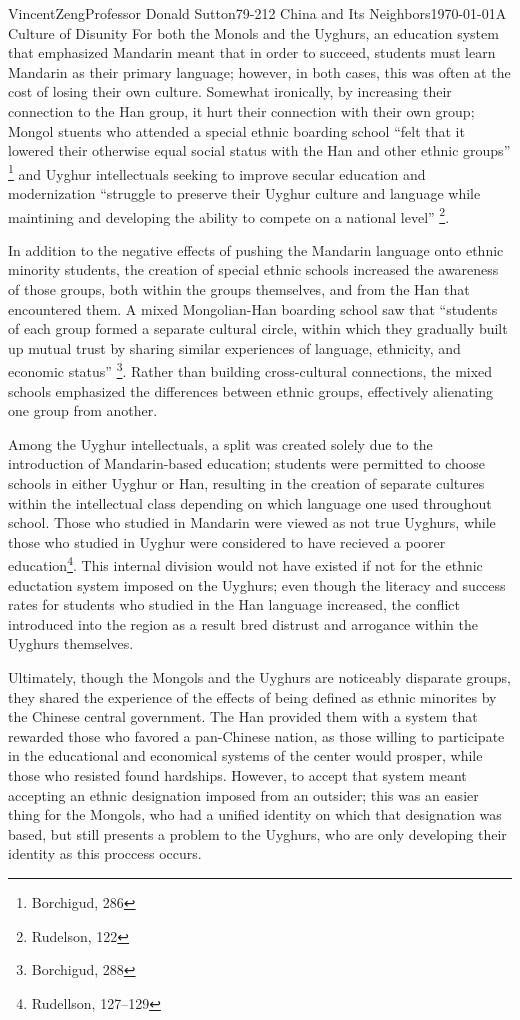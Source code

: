 \documentclass{article}[12pt]
\begin{document}
\begin{mla}{Vincent}{Zeng}{Professor Donald Sutton}{79-212 China and Its Neighbors}{\today}{A Culture of Disunity}
For both the Monols and the Uyghurs, an education system that emphasized
Mandarin meant that in order to succeed, students must learn Mandarin as their
primary language; however, in both cases, this was often at the cost of losing
their own culture. Somewhat ironically, by increasing their connection to the
Han group, it hurt their connection with their own group; Mongol stuents who
attended a special ethnic boarding school ``felt that it lowered their
otherwise equal social status with the Han and other ethnic groups''
\footnote{Borchigud, 286} and Uyghur intellectuals seeking to improve secular
education and modernization ``struggle to preserve their Uyghur culture and
language while maintining and developing the ability to compete on a national
level'' \footnote{Rudelson, 122}.

In addition to the negative effects of pushing the Mandarin language onto
ethnic minority students, the creation of special ethnic schools increased the
awareness of those groups, both within the groups themselves, and from the Han
that encountered them. A mixed Mongolian-Han boarding school saw that
``students of each group formed a separate cultural circle, within which they
gradually built up mutual trust by sharing similar experiences of language,
ethnicity, and economic status'' \footnote{Borchigud, 288}. Rather than
building cross-cultural connections, the mixed schools emphasized the
differences between ethnic groups, effectively alienating one group from
another.

Among the Uyghur intellectuals, a split was created solely due to the
introduction of Mandarin-based education; students were permitted to choose
schools in either Uyghur or Han, resulting in the creation of separate cultures
within the intellectual class depending on which language one used throughout
school. Those who studied in Mandarin were viewed as not true Uyghurs, while
those who studied in Uyghur were considered to have recieved a poorer
education\footnote{Rudellson, 127--129}. This internal division would not have
existed if not for the ethnic eductation system imposed on the Uyghurs; even
though the literacy and success rates for students who studied in the Han
language increased, the conflict introduced into the region as a result bred
distrust and arrogance within the Uyghurs themselves.

Ultimately, though the Mongols and the Uyghurs are noticeably
disparate groups, they shared the experience of the effects of being defined as
ethnic minorites by the Chinese central government. The Han provided them with
a system that rewarded those who favored a pan-Chinese nation, as those willing
to participate in the educational and economical systems of the center would
prosper, while those who resisted found hardships. However, to accept that
system meant accepting an ethnic designation imposed from an outsider; this was
an easier thing for the Mongols, who had a unified identity on which that
designation was based, but still presents a problem to the Uyghurs, who are
only developing their identity as this proccess occurs.


\end{mla}
\end{document}
